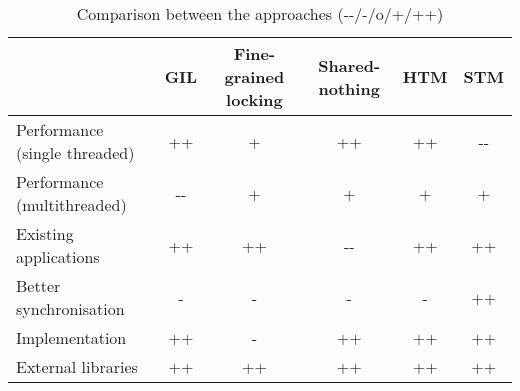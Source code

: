 \documentclass{sigplanconf}
\begin{document}






\begin{table*}[ht]
  \centering
  \begin{tabular}{|l|c|c|c|c|c|}
    \hline
    & \textbf{GIL} & \textbf{Fine-grained locking}
    & \textbf{Shared-nothing} & \textbf{HTM} & \textbf{STM}\\
    \hline
    Performance (single threaded) & ++   & +  & ++   & ++ & -{-} \\
    \hline
    Performance (multithreaded)   & -{-} & +  & +    & +  & +    \\
    \hline
    Existing applications         & ++   & ++ & -{-} & ++ & ++   \\
    \hline
    Better synchronisation        & -    & -  & -    & -  & ++   \\
    \hline
    Implementation                & ++   & -  & ++   & ++ & ++   \\
    \hline
    External libraries            & ++   & ++ & ++   & ++ & ++   \\
    \hline
  \end{tabular}
  \caption{Comparison between the approaches (-{-}/-/o/+/++)}
  \label{tab:comparison}
\end{table*}
\end{document}
